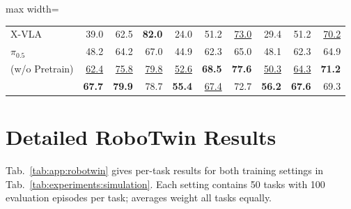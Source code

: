 \begin{center}
\begin{minipage}{\linewidth}
\begin{adjustbox}{max width=\linewidth}
\begin{tabular*}{0.94\linewidth}{@{\extracolsep{\fill}}l*{9}{r}@{}}
        X-VLA & 39.0 & 62.5 & \textbf{82.0} & 24.0 & 51.2 & \underline{73.0} & 29.4 & 51.2 & \underline{70.2} \\
        $\pi_{0.5}$ & 48.2 & 64.2 & 67.0 & 44.9 & 62.3 & 65.0 & 48.1 & 62.3 & 64.9 \\
        \midrule
        \method{} (w/o Pretrain) & \underline{62.4} & \underline{75.8} & \underline{79.8} & \underline{52.6} & \textbf{68.5} & \textbf{77.6} & \underline{50.3} & \underline{64.3} & \textbf{71.2} \\
        \method{} & \textbf{67.7} & \textbf{79.9} & 78.7 & \textbf{55.4} & \underline{67.4} & 72.7 & \textbf{56.2} & \textbf{67.6} & 69.3 \\
        \bottomrule
    \end{tabular*}
    \end{adjustbox}
\end{minipage}
\end{center}


\section{Detailed RoboTwin Results}
\label{app:robotwin}

Tab.~\ref{tab:app:robotwin} gives per-task results for both training settings
in Tab.~\ref{tab:experiments:simulation}. Each setting contains 50 tasks
with 100 evaluation episodes per task; averages weight all tasks equally.


